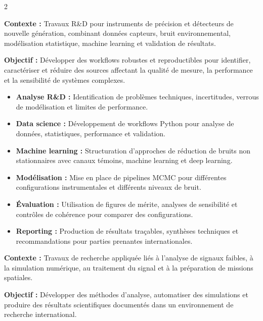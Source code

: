 \documentclass[8pt,a4paper,ragged2e,withhyper]{altacv}
\begin{document}
\begin{paracol}{2}

\textbf{Contexte :} Travaux R\&D pour instruments de précision et détecteurs de nouvelle génération, combinant données capteurs, bruit environnemental, modélisation statistique, machine learning et validation de résultats.

\textbf{Objectif :} Développer des workflows robustes et reproductibles pour identifier, caractériser et réduire des sources affectant la qualité de mesure, la performance et la sensibilité de systèmes complexes.

\begin{itemize}
  \item \textbf{Analyse R\&D :} Identification de problèmes techniques, incertitudes, verrous de modélisation et limites de performance.
  \item \textbf{Data science :} Développement de workflows Python pour analyse de données, statistiques, performance et validation.
  \item \textbf{Machine learning :} Structuration d’approches de réduction de bruits non stationnaires avec canaux témoins, machine learning et deep learning.
  \item \textbf{Modélisation :} Mise en place de pipelines MCMC pour différentes configurations instrumentales et différents niveaux de bruit.
  \item \textbf{Évaluation :} Utilisation de figures de mérite, analyses de sensibilité et contrôles de cohérence pour comparer des configurations.
  \item \textbf{Reporting :} Production de résultats traçables, synthèses techniques et recommandations pour parties prenantes internationales.
\end{itemize}

\divider


\textbf{Contexte :} Travaux de recherche appliquée liés à l’analyse de signaux faibles, à la simulation numérique, au traitement du signal et à la préparation de missions spatiales.

\textbf{Objectif :} Développer des méthodes d’analyse, automatiser des simulations et produire des résultats scientifiques documentés dans un environnement de recherche international.


\end{paracol}
\end{document}
